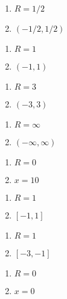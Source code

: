 {
{\begin{enumerate}
        \item $R=1/2$
        \item   $(-1/2,1/2)$
\end{enumerate}}

{\begin{enumerate}
        \item $R=1$
        \item   $(-1,1)$
\end{enumerate}}

{\begin{enumerate}
        \item $R=3$
        \item   $(-3,3)$
\end{enumerate}}

{\begin{enumerate}
        \item $R=\infty$
        \item   $(-\infty,\infty)$
\end{enumerate}}

{\begin{enumerate}
        \item $R=0$
        \item   $x=10$
\end{enumerate}}

{\begin{enumerate}
        \item $R=1$
        \item   $[-1,1]$
\end{enumerate}}

{\begin{enumerate}
        \item $R=1$
        \item   $[-3,-1]$
\end{enumerate}}

{\begin{enumerate}
        \item $R=0$
        \item   $x=0$
\end{enumerate}}

}
